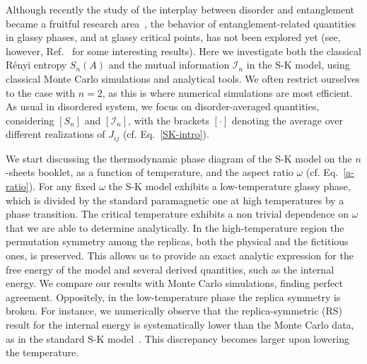 \documentclass[twocolumn,superscriptaddress,prb,10pt]{revtex4-1}
\begin{document}
Although recently the study of the interplay between disorder and entanglement became a fruitful 
research area~\cite{refael-2009}, the behavior of entanglement-related quantities 
in glassy phases, and at glassy critical points, has not been explored yet (see, however,  
Ref.~ for some interesting results). Here we investigate 
both the classical R\'enyi entropy $S_n(A)$ and the mutual information ${\mathcal I}_n$ 
in the S-K model, using classical Monte Carlo simulations and analytical tools. We often 
restrict ourselves to the case with $n=2$, as this is where numerical simulations are 
most efficient. As usual in disordered system, we focus on disorder-averaged quantities, 
considering $[S_n]$ and $[{\mathcal I}_n]$, with the brackets $[\cdot]$ denoting the 
average over different realizations of $J_{ij}$ (cf. Eq.~\eqref{SK-intro}).

We start discussing the thermodynamic phase diagram of the S-K model on the $n$-sheets 
booklet, as a function of temperature, and the aspect ratio $\omega$ (cf. Eq.~\eqref{a-ratio}). 
For any fixed $\omega$ the S-K model exhibits a low-temperature glassy phase, which is divided 
by the standard paramagnetic one at high temperatures by a phase transition. The critical 
temperature exhibits a non trivial dependence on $\omega$ that we are able to determine 
analytically. In the high-temperature region the permutation symmetry among the replicas, 
both the physical and the fictitious ones, is preserved. This allows us to provide an exact 
analytic expression for the free energy of the model and several derived quantities, such as 
the internal energy. We compare our results with Monte Carlo simulations, finding perfect 
agreement. Oppositely, in the low-temperature phase the replica symmetry is broken. For 
instance, we numerically observe that the replica-symmetric (RS) result for the internal 
energy is systematically lower than the Monte Carlo data, as in the standard S-K 
model~\cite{sherrington-1978-prl,sherrington-1978}. This discrepancy becomes larger upon 
lowering the temperature.  
\end{document}
